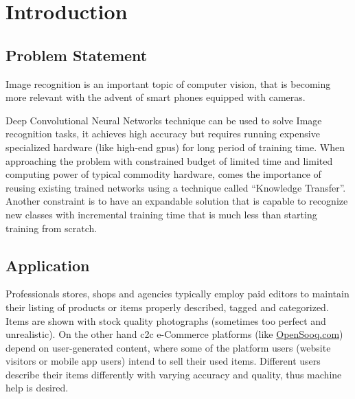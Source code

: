 \chapter{Introduction}
\setcounter{page}{1}


\section{Problem Statement}

Image recognition is an important topic of computer vision,
that is becoming more relevant with the advent of smart phones equipped with cameras.

Deep Convolutional Neural Networks technique can be used to solve Image recognition tasks,
it achieves high accuracy but requires running expensive specialized hardware (like high-end \glspl{gpu})
for long period of training time.
When approaching the problem with constrained budget of limited time and limited computing power of typical commodity hardware,
comes the importance of reusing existing trained networks using a technique called ``Knowledge Transfer''.
Another constraint is to have an expandable solution that is capable to recognize new classes
with incremental training time that is much less than starting training from scratch.

\section{Application}

Professionals stores, shops and agencies typically employ paid editors to maintain their listing
of products or items properly described, tagged and categorized.
Items are shown with stock quality photographs (sometimes too perfect and unrealistic).
On the other hand \gls{c2c} e-Commerce platforms
(like \href{http://opensooq.com}{OpenSooq.com}) depend on user-generated content,
where some of the platform users (website visitors or mobile app users) intend to sell their used items.
Different users describe their items differently with varying accuracy and quality, thus machine help is desired.

